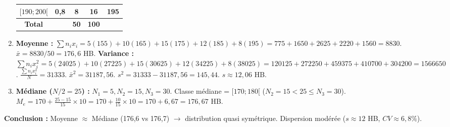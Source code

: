 \documentclass[11pt]{article}
\begin{document}
\begin{exoresolu}
\begin{enumerate}
\begin{center}
\begin{tabular}{|c|c|c|c|c|}
        $[190;200[$ & 0,8 & 8 & 16 & 195 \\ \hline \hline
        \textbf{Total} & & \textbf{50} & \textbf{100} & \\ \hline
        \end{tabular}
        \end{center}
        \item \textbf{Moyenne :} $\sum n_i x_i = 5(155)+10(165)+15(175)+12(185)+8(195) = 775+1650+2625+2220+1560 = 8830$.
        $\bar{x} = 8830 / 50 = 176,6$ HB.
        \textbf{Variance :} $\sum n_i x_i^2 = 5(24025)+10(27225)+15(30625)+12(34225)+8(38025) = 120125+272250+459375+410700+304200 = 1566650$.
        $\frac{\sum n_i x_i^2}{N} = 31333$. $\bar{x}^2 = 31187,56$.
        $s^2 = 31333 - 31187,56 = 145,44$. $s \approx 12,06$ HB.
        \item \textbf{Médiane ($N/2=25$) :} $N_1=5, N_2=15, N_3=30$. Classe médiane = $[170;180[$ ($N_2=15 < 25 \le N_3=30$).
        $M_e = 170 + \frac{25 - 15}{15} \times 10 = 170 + \frac{10}{15}\times 10 = 170 + 6,67 = 176,67$ HB.
    \end{enumerate}
    \textbf{Conclusion :} Moyenne $\approx$ Médiane (176,6 vs 176,7) $\rightarrow$ distribution quasi symétrique. Dispersion modérée ($s \approx 12$ HB, $CV \approx 6,8\%$).
\end{exoresolu}
\end{document}
